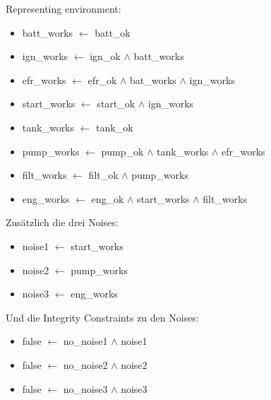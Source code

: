 \documentclass[ngerman]{fbi-aufgabenblatt}
\begin{document}
Representing environment:
\begin{itemize}
\item batt\_works \(\leftarrow\) batt\_ok
\item ign\_works \(\leftarrow\) ign\_ok \(\land\) batt\_works
\item efr\_works \(\leftarrow\) efr\_ok \(\land\) bat\_works \(\land\) ign\_works
\item start\_works \(\leftarrow\) start\_ok \(\land\) ign\_works
\item tank\_works \(\leftarrow\) tank\_ok
\item pump\_works \(\leftarrow\) pump\_ok \(\land\) tank\_works \(\land\) efr\_works
\item filt\_works \(\leftarrow\) filt\_ok \(\land\) pump\_works
\item eng\_works \(\leftarrow\) eng\_ok \(\land\) start\_works \(\land\) filt\_works \\
\end{itemize}

Zusätzlich die drei Noises:
\begin{itemize}
\item noise1 \(\leftarrow\) start\_works
\item noise2 \(\leftarrow\) pump\_works
\item noise3 \(\leftarrow\) eng\_works \\
\end{itemize}

Und die Integrity Constraints zu den Noises:
\begin{itemize}
\item false \(\leftarrow\) no\_noise1 \(\land\) noise1
\item false \(\leftarrow\) no\_noise2 \(\land\) noise2
\item false \(\leftarrow\) no\_noise3 \(\land\) noise3 \\
\end{itemize}
\end{document}

